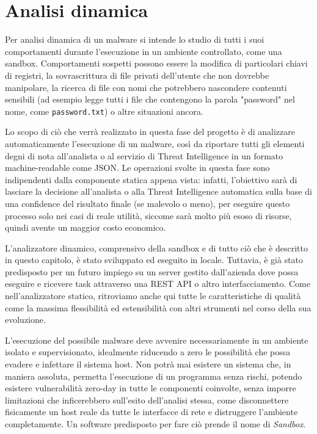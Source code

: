 \chapter{Analisi dinamica}
Per analisi dinamica di un malware si intende lo studio di tutti i suoi comportamenti durante l'esecuzione in un ambiente controllato, come una sandbox.
Comportamenti sospetti possono essere la modifica di particolari chiavi di registri, la sovrascrittura di file privati dell'utente che non dovrebbe manipolare, la ricerca di file con nomi che potrebbero nascondere contenuti sensibili (ad esempio legge tutti i file che contengono la parola  "password" nel nome, come \texttt{password.txt}) o altre situazioni ancora.

Lo scopo di ciò che verrà realizzato in questa fase del progetto è di analizzare automaticamente l'esecuzione di un malware, così da riportare tutti gli elementi degni di nota all'analista o al servizio di Threat Intelligence in un formato machine-readable come JSON.
Le operazioni svolte in questa fase sono indipendenti dalla componente statica appena vista:
infatti, l'obiettivo sarà di lasciare la decisione all'analista o alla Threat Intelligence automatica sulla base di una confidence del risultato finale (se malevolo o meno), per eseguire questo processo solo nei casi di reale utilità, siccome sarà molto più esoso di risorse, quindi avente un maggior costo economico.

L'analizzatore dinamico, comprensivo della sandbox e di tutto ciò che è descritto in questo capitolo, è stato sviluppato ed eseguito in locale. Tuttavia, è già stato predisposto per un futuro impiego su un server gestito dall'azienda dove possa eseguire e ricevere task attraverso una REST API o altro interfacciamento.
Come nell'analizzatore statico, ritroviamo anche qui tutte le caratteristiche di qualità come la massima flessibilità ed estensibilità con altri strumenti nel corso della sua evoluzione.

L'esecuzione del possibile malware deve avvenire necessariamente in un ambiente isolato e supervisionato, idealmente riducendo a zero le possibilità che possa evadere e infettare il sistema host.
Non potrà mai esistere un sistema che, in maniera assoluta, permetta l'esecuzione di un programma senza rischi, potendo esistere vulnerabilità zero-day in tutte le componenti coinvolte, senza imporre limitazioni che inficerebbero sull'esito dell'analisi stessa, come disconnettere fisicamente un host reale da tutte le interfacce di rete e distruggere l'ambiente completamente.
Un software predisposto per fare ciò prende il nome di \emph{Sandbox}.

